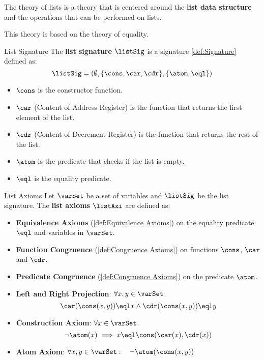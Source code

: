 The theory of lists is a theory that is centered around the
\textbf{list data structure} and the operations that can be
performed on lists.

This theory is based on the theory of equality.

\begin{definition}{List Signature}
    The \textbf{list signature} $\listSig$ is
    a signature \ref{def:Signature} defined as:
    \begin{equation*}
        \listSig = (\emptyset,\{\cons, \car, \cdr\},\{\atom,\eql\})
    \end{equation*}
    \begin{itemize}
        \item $\cons$ is the constructor function.
        \item $\car$ (Content of Address Register) is the function that
        returns the first element of the list.
        \item $\cdr$ (Content of Decrement Register) is the function that
        returns the rest of the list.        
        \item $\atom$ is the predicate that checks if the list is empty.
        \item $\eql$ is the equality predicate.
    \end{itemize}
\end{definition}

\begin{definition}{List Axioms}
    Let $\varSet$ be a set of variables and $\listSig$ be the list signature. 
    The \textbf{list axioms} $\listAxi$ are defined as:
    \begin{itemize}
        \item \textbf{Equivalence Axioms} (\ref{def:Equivalence Axioms}) on 
        the equality predicate $\eql$ and variables in $\varSet$.
        \item \textbf{Function Congruence} (\ref{def:Congruence Axioms}) on 
        functions $\cons$, $\car$ and $\cdr$.
        \item \textbf{Predicate Congruence} (\ref{def:Congruence Axioms}) on
        the predicate $\atom$.
        \item \textbf{Left and Right Projection}: $\forall x,y \in \varSet$. 
        \begin{equation*}
            \car(\cons(x,y)) \eql x \land \cdr(\cons(x,y)) \eql y
        \end{equation*}
        
        \item \textbf{Construction Axiom}: $\forall x \in \varSet$.
        \begin{equation*}
            \neg\atom(x) \implies x \eql \cons(\car(x),\cdr(x)) 
        \end{equation*}
        
        \item \textbf{Atom Axiom}: $\forall x,y \in \varSet: \quad \neg \atom(\cons(x,y))$
    \end{itemize}
\end{definition}

